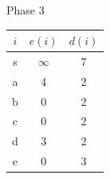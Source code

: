 \documentclass[hyperref={},
xcolor={dvipsnames,svgnames,table},10pt]{beamer}
\begin{document}
\begin{frame}{Phase 3}
\begin{minipage}[c]{0.3\linewidth}
	\end{minipage}\hfill 
	\begin{minipage}[c]{0.3\linewidth}
		\begin{tabular}{|c|c|c|}
			\hline
			$i$ & $e(i)$ & $d(i)$ \\ \hline
			s & $\infty$ & 7 \\ \hline
			a &  4 & 2 \\ \hline
			b &  0 & 2 \\ \hline
			c &  0 & 2 \\ \hline
			d &  3 & 2 \\ \hline
			e &  0 & 3 \\ \hline
		\end{tabular}
	\end{minipage}
\end{frame}
\end{document}
